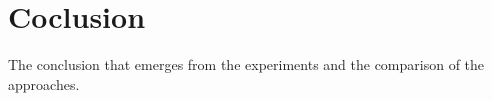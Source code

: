 \chapter{Coclusion}

The conclusion that emerges from the experiments and the comparison of the approaches.
